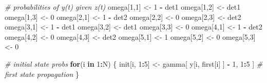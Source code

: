 \documentclass[
  12pt,
]{krantz}
\newenvironment{Shaded}{\begin{snugshade}}{\end{snugshade}}
\newcommand{\CommentTok}[1]{\textcolor[rgb]{0.56,0.35,0.01}{\textit{#1}}}
\newcommand{\ControlFlowTok}[1]{\textcolor[rgb]{0.13,0.29,0.53}{\textbf{#1}}}
\newcommand{\DecValTok}[1]{\textcolor[rgb]{0.00,0.00,0.81}{#1}}
\newcommand{\NormalTok}[1]{#1}
\newcommand{\OtherTok}[1]{\textcolor[rgb]{0.56,0.35,0.01}{#1}}
\newcommand{\SpecialCharTok}[1]{\textcolor[rgb]{0.81,0.36,0.00}{\textbf{#1}}}
\begin{document}
\begin{Shaded}
\begin{Highlighting}[]
  \CommentTok{\# probabilities of y(t) given z(t)}
\NormalTok{  omega[}\DecValTok{1}\NormalTok{,}\DecValTok{1}\NormalTok{] }\OtherTok{\textless{}{-}} \DecValTok{1} \SpecialCharTok{{-}}\NormalTok{ det1}
\NormalTok{  omega[}\DecValTok{1}\NormalTok{,}\DecValTok{2}\NormalTok{] }\OtherTok{\textless{}{-}}\NormalTok{ det1}
\NormalTok{  omega[}\DecValTok{1}\NormalTok{,}\DecValTok{3}\NormalTok{] }\OtherTok{\textless{}{-}} \DecValTok{0}
\NormalTok{  omega[}\DecValTok{2}\NormalTok{,}\DecValTok{1}\NormalTok{] }\OtherTok{\textless{}{-}} \DecValTok{1} \SpecialCharTok{{-}}\NormalTok{ det2}
\NormalTok{  omega[}\DecValTok{2}\NormalTok{,}\DecValTok{2}\NormalTok{] }\OtherTok{\textless{}{-}} \DecValTok{0}
\NormalTok{  omega[}\DecValTok{2}\NormalTok{,}\DecValTok{3}\NormalTok{] }\OtherTok{\textless{}{-}}\NormalTok{ det2}
\NormalTok{  omega[}\DecValTok{3}\NormalTok{,}\DecValTok{1}\NormalTok{] }\OtherTok{\textless{}{-}} \DecValTok{1} \SpecialCharTok{{-}}\NormalTok{ det1}
\NormalTok{  omega[}\DecValTok{3}\NormalTok{,}\DecValTok{2}\NormalTok{] }\OtherTok{\textless{}{-}}\NormalTok{ det1}
\NormalTok{  omega[}\DecValTok{3}\NormalTok{,}\DecValTok{3}\NormalTok{] }\OtherTok{\textless{}{-}} \DecValTok{0}
\NormalTok{  omega[}\DecValTok{4}\NormalTok{,}\DecValTok{1}\NormalTok{] }\OtherTok{\textless{}{-}} \DecValTok{1} \SpecialCharTok{{-}}\NormalTok{ det2}
\NormalTok{  omega[}\DecValTok{4}\NormalTok{,}\DecValTok{2}\NormalTok{] }\OtherTok{\textless{}{-}} \DecValTok{0}
\NormalTok{  omega[}\DecValTok{4}\NormalTok{,}\DecValTok{3}\NormalTok{] }\OtherTok{\textless{}{-}}\NormalTok{ det2}
\NormalTok{  omega[}\DecValTok{5}\NormalTok{,}\DecValTok{1}\NormalTok{] }\OtherTok{\textless{}{-}} \DecValTok{1}
\NormalTok{  omega[}\DecValTok{5}\NormalTok{,}\DecValTok{2}\NormalTok{] }\OtherTok{\textless{}{-}} \DecValTok{0}
\NormalTok{  omega[}\DecValTok{5}\NormalTok{,}\DecValTok{3}\NormalTok{] }\OtherTok{\textless{}{-}} \DecValTok{0}
  
  \CommentTok{\# initial state probs}
  \ControlFlowTok{for}\NormalTok{(i }\ControlFlowTok{in} \DecValTok{1}\SpecialCharTok{:}\NormalTok{N) \{}
\NormalTok{    init[i, }\DecValTok{1}\SpecialCharTok{:}\DecValTok{5}\NormalTok{] }\OtherTok{\textless{}{-}}\NormalTok{ gamma[ y[i, first[i] ] }\SpecialCharTok{{-}} \DecValTok{1}\NormalTok{, }\DecValTok{1}\SpecialCharTok{:}\DecValTok{5}\NormalTok{ ] }\CommentTok{\# first state propagation}
\NormalTok{  \}}
  

\end{Highlighting}
\end{Shaded}
\end{document}
